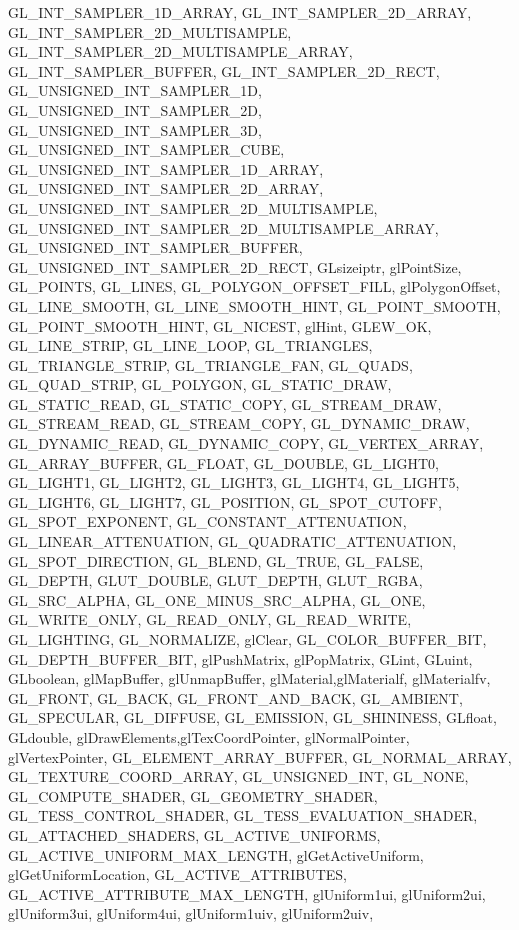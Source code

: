 {{{            GL_INT_SAMPLER_1D_ARRAY,
            GL_INT_SAMPLER_2D_ARRAY,
            GL_INT_SAMPLER_2D_MULTISAMPLE,
            GL_INT_SAMPLER_2D_MULTISAMPLE_ARRAY,
            GL_INT_SAMPLER_BUFFER,
            GL_INT_SAMPLER_2D_RECT,
            GL_UNSIGNED_INT_SAMPLER_1D,
            GL_UNSIGNED_INT_SAMPLER_2D,
            GL_UNSIGNED_INT_SAMPLER_3D,
            GL_UNSIGNED_INT_SAMPLER_CUBE,
            GL_UNSIGNED_INT_SAMPLER_1D_ARRAY,
            GL_UNSIGNED_INT_SAMPLER_2D_ARRAY,
            GL_UNSIGNED_INT_SAMPLER_2D_MULTISAMPLE,
            GL_UNSIGNED_INT_SAMPLER_2D_MULTISAMPLE_ARRAY,
            GL_UNSIGNED_INT_SAMPLER_BUFFER,
            GL_UNSIGNED_INT_SAMPLER_2D_RECT,
            GLsizeiptr,
            glPointSize,
		GL_POINTS, GL_LINES, GL_POLYGON_OFFSET_FILL, glPolygonOffset, GL_LINE_SMOOTH, GL_LINE_SMOOTH_HINT, GL_POINT_SMOOTH, GL_POINT_SMOOTH_HINT, GL_NICEST, glHint, GLEW_OK, GL_LINE_STRIP, GL_LINE_LOOP, GL_TRIANGLES, GL_TRIANGLE_STRIP, GL_TRIANGLE_FAN, GL_QUADS, GL_QUAD_STRIP, GL_POLYGON, 
		GL_STATIC_DRAW, GL_STATIC_READ, GL_STATIC_COPY,
		GL_STREAM_DRAW, GL_STREAM_READ, GL_STREAM_COPY,
		GL_DYNAMIC_DRAW, GL_DYNAMIC_READ, GL_DYNAMIC_COPY,
		GL_VERTEX_ARRAY, GL_ARRAY_BUFFER, GL_FLOAT, GL_DOUBLE,
		GL_LIGHT0, GL_LIGHT1, GL_LIGHT2, GL_LIGHT3, GL_LIGHT4, GL_LIGHT5, GL_LIGHT6, GL_LIGHT7,
		GL_POSITION, GL_SPOT_CUTOFF, GL_SPOT_EXPONENT, GL_CONSTANT_ATTENUATION, GL_LINEAR_ATTENUATION, GL_QUADRATIC_ATTENUATION, GL_SPOT_DIRECTION,
		GL_BLEND, GL_TRUE, GL_FALSE, GL_DEPTH, GLUT_DOUBLE, GLUT_DEPTH, GLUT_RGBA, GL_SRC_ALPHA, GL_ONE_MINUS_SRC_ALPHA, GL_ONE, GL_WRITE_ONLY, GL_READ_ONLY, GL_READ_WRITE,
		GL_LIGHTING, GL_NORMALIZE,
		glClear,
		GL_COLOR_BUFFER_BIT, GL_DEPTH_BUFFER_BIT,
		glPushMatrix, glPopMatrix,
		GLint, GLuint,
		GLboolean, glMapBuffer, glUnmapBuffer, glMaterial,glMaterialf, glMaterialfv, GL_FRONT, GL_BACK, GL_FRONT_AND_BACK, GL_AMBIENT, GL_SPECULAR, GL_DIFFUSE, GL_EMISSION, GL_SHININESS,
		GLfloat, GLdouble, glDrawElements,glTexCoordPointer, glNormalPointer, glVertexPointer, GL_ELEMENT_ARRAY_BUFFER, GL_NORMAL_ARRAY, GL_TEXTURE_COORD_ARRAY, GL_UNSIGNED_INT,
        GL_NONE,
        GL_COMPUTE_SHADER,
        GL_GEOMETRY_SHADER,
        GL_TESS_CONTROL_SHADER,
        GL_TESS_EVALUATION_SHADER,
        GL_ATTACHED_SHADERS,
        GL_ACTIVE_UNIFORMS,
        GL_ACTIVE_UNIFORM_MAX_LENGTH,
        glGetActiveUniform,
        glGetUniformLocation,
        GL_ACTIVE_ATTRIBUTES,
        GL_ACTIVE_ATTRIBUTE_MAX_LENGTH,
        glUniform1ui,
        glUniform2ui,
        glUniform3ui,
        glUniform4ui,
        glUniform1uiv,
        glUniform2uiv,
}}}
